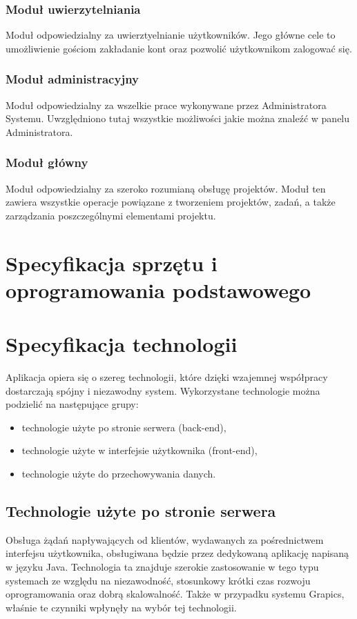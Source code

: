 \documentclass[12pt, oneside, final]{report}
\begin{document}
\subsection{Moduł uwierzytelniania}
Moduł odpowiedzialny za uwierztyelnianie użytkowników. Jego główne cele to umożliwienie gościom zakładanie kont oraz pozwolić użytkownikom zalogować się.
\subsection{Moduł administracyjny}
Moduł odpowiedzialny za wszelkie prace wykonywane przez Administratora Systemu. Uwzględniono tutaj wszystkie możliwości jakie można znaleźć w panelu Administratora.
\subsection{Moduł główny}
Moduł odpowiedzialny za szeroko rozumianą obsługę projektów. Moduł ten zawiera wszystkie operacje powiązane z tworzeniem projektów, zadań, a także zarządzania poszczególnymi elementami projektu.

\chapter{Specyfikacja sprzętu i oprogramowania podstawowego}
\todo
\chapter{Specyfikacja technologii}
Aplikacja opiera się o szereg technologii, które dzięki wzajemnej współpracy dostarczają spójny i niezawodny system. Wykorzystane technologie można podzielić na następujące grupy:
\begin{itemize}
	\item technologie użyte po stronie serwera (back-end),
	\item technologie użyte w interfejsie użytkownika (front-end),
	\item technologie użyte do przechowywania danych.
\end{itemize}
\section{Technologie użyte po stronie serwera}
Obsługa żądań napływających od klientów, wydawanych za pośrednictwem interfejsu użytkownika, obsługiwana będzie przez dedykowaną aplikację napisaną w języku Java. Technologia ta znajduje szerokie zastosowanie w tego typu systemach ze względu na niezawodność, stosunkowy krótki czas rozwoju oprogramowania oraz dobrą skalowalność. Także w przypadku systemu Grapics, właśnie te czynniki wpłynęły na wybór tej technologii.
\end{document}
